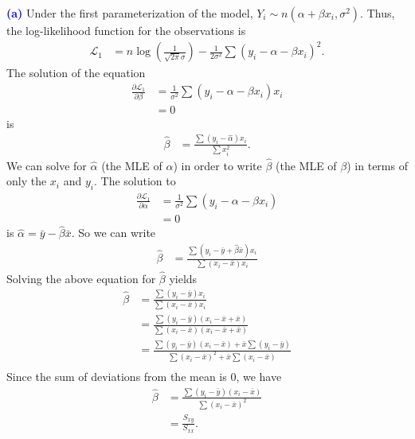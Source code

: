 \documentclass[12pt]{article}
\begin{document}
\noindent \textcolor{blue}{\textbf{(a)}} Under the first parameterization of the model, $Y_i \sim n(\alpha + \beta x_i, \sigma^2)$. Thus, the log-likelihood function for the observations is
\begin{align}
\mathscr{L}_1 &= n\log\left(\frac{1}{\sqrt{2\pi}\sigma}\right) - \frac{1}{2\sigma^2}\sum(y_i - \alpha - \beta x_i)^2.
\end{align}
The solution of the equation 
\begin{align}
\frac{\partial \mathscr{L}_1}{\partial \beta} &= \frac{1}{\sigma^2}\sum (y_i - \alpha - \beta x_i)x_i \\
&= 0
\end{align}
is 
\begin{align}
\hat{\beta} &= \frac{\sum (y_i - \hat{\alpha})x_i}{\sum x_i^2}.
\end{align}
We can solve for $\hat{\alpha}$ (the MLE of $\alpha$) in order to write $\hat{\beta}$ (the MLE of $\beta$) in terms of only the $x_i$ and $y_i$. The solution to 
\begin{align}
\frac{\partial \mathscr{L}_1}{\partial \alpha} &= \frac{1}{\sigma^2}\sum(y_i - \alpha - \beta x_i) \\
&= 0
\end{align}
is $\hat{\alpha} =\bar{y} - \hat{\beta}\bar{x}.$ So we can write
\begin{align}
\hat{\beta} &= \frac{\sum(y_i - \bar{y} + \hat{\beta}\bar{x})x_i}{\sum (x_i-\bar{x})x_i}
\end{align}
Solving the above equation for $\hat{\beta}$ yields 
\begin{align}
\hat{\beta} &= \frac{\sum(y_i-\bar{y})x_i}{\sum(x_i-\bar{x})x_i} \\
&= \frac{\sum(y_i-\bar{y})(x_i -\bar{x} + \bar{x})}{\sum (x_i-\bar{x})(x_i - \bar{x} + \bar{x})} \\
&= \frac{\sum(y_i-\bar{y})(x_i - \bar{x}) + \bar{x}\sum(y_i-\bar{y})}{\sum(x_i - \bar{x})^2 + \bar{x}\sum(x_i-\bar{x})} \\
\end{align}
Since the sum of deviations from the mean is $0$, we have 
\begin{align}
\hat{\beta} &= \frac{\sum(y_i-\bar{y})(x_i - \bar{x})}{\sum(x_i - \bar{x})^2} \\
&= \frac{S_{xy}}{S_{xx}}.
\end{align}
\end{document}
